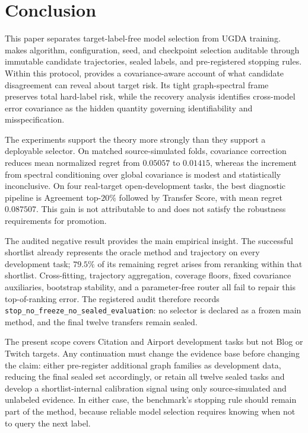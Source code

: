 \section{Conclusion}

This paper separates target-label-free model selection from UGDA training.
\benchmark makes algorithm, configuration, seed, and checkpoint selection
auditable through immutable candidate trajectories, sealed labels, and
pre-registered stopping rules. Within this protocol, \method provides a
covariance-aware account of what candidate disagreement can reveal about
target risk. Its tight graph-spectral frame preserves total hard-label risk,
while the recovery analysis identifies cross-model error covariance as the
hidden quantity governing identifiability and misspecification.

The experiments support the theory more strongly than they support a
deployable selector. On matched source-simulated folds, covariance correction
reduces mean normalized regret from $0.05057$ to $0.01415$, whereas the
increment from spectral conditioning over global covariance is modest and
statistically inconclusive. On four real-target open-development tasks, the
best diagnostic pipeline is Agreement top-$20\%$ followed by Transfer Score,
with mean regret $0.087507$. This gain is not attributable to \method and does
not satisfy the robustness requirements for promotion.

The audited negative result provides the main empirical insight. The successful
shortlist already represents the oracle method and trajectory on every
development task; $79.5\%$ of its remaining regret arises from reranking
within that shortlist. Cross-fitting, trajectory aggregation, coverage floors,
fixed covariance auxiliaries, bootstrap stability, and a parameter-free router
all fail to repair this top-of-ranking error. The registered audit therefore
records \texttt{stop\_no\_freeze\_no\_sealed\_evaluation}: no selector is
declared as a frozen main method, and the final twelve transfers remain sealed.

The present scope covers Citation and Airport development tasks but not Blog
or Twitch targets. Any continuation must change the evidence base before
changing the claim: either pre-register additional graph families as
development data, reducing the final sealed set accordingly, or retain all
twelve sealed tasks and develop a shortlist-internal calibration signal using
only source-simulated and unlabeled evidence. In either case, the benchmark's
stopping rule should remain part of the method, because reliable model
selection requires knowing when not to query the next label.
